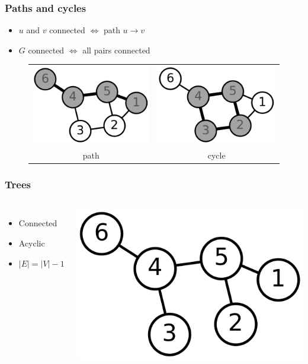 \documentclass[12pt]{beamer}
\begin{document}
\begin{frame}
\frametitle{Paths and cycles}
\begin{itemize}
\item $u$ and $v$ connected $\Leftrightarrow$ path $u \to v$
\item $G$ connected $\Leftrightarrow$ all pairs connected
\end{itemize}
\begin{figure}
\centering
\begin{tabular}{cc}
\includegraphics[width=0.4\linewidth]{img/6n-path}
& \includegraphics[width=0.4\linewidth]{img/6n-cycle} \\
path & cycle
\end{tabular}
\end{figure}
\end{frame}

\begin{frame}
\frametitle{Trees}
\begin{columns}[c]
\begin{itemize}
\item Connected
\item Acyclic
\item $|E| = |V|-1$
\end{itemize}
\centering
\includegraphics[width=0.7\linewidth]{img/6n-tree}
\end{columns}
\end{frame}
\end{document}
